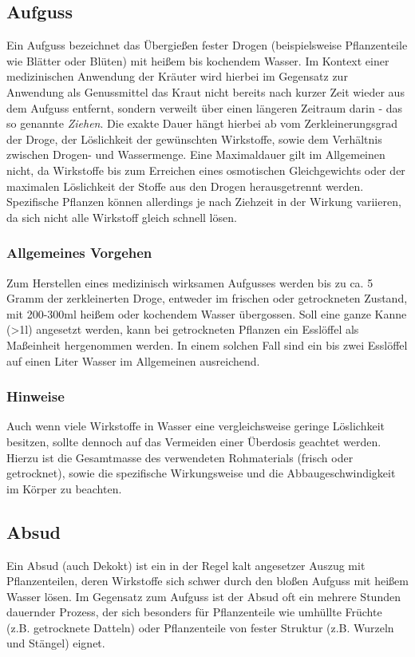 \subsection{Aufguss}
Ein Aufguss bezeichnet das Übergießen fester Drogen (beispielsweise Pflanzenteile wie Blätter oder Blüten) mit heißem bis kochendem Wasser. Im Kontext einer medizinischen Anwendung der Kräuter wird hierbei im Gegensatz zur Anwendung als Genussmittel das Kraut nicht bereits nach kurzer Zeit wieder aus dem Aufguss entfernt, sondern verweilt über einen längeren Zeitraum darin - das so genannte \textit{Ziehen}. Die exakte Dauer hängt hierbei ab vom Zerkleinerungsgrad der Droge, der Löslichkeit der gewünschten Wirkstoffe, sowie dem Verhältnis zwischen Drogen- und Wassermenge. Eine Maximaldauer gilt im Allgemeinen nicht, da Wirkstoffe bis zum Erreichen eines osmotischen Gleichgewichts oder der maximalen Löslichkeit der Stoffe aus den Drogen herausgetrennt werden. Spezifische Pflanzen können allerdings je nach Ziehzeit in der Wirkung variieren, da sich nicht alle Wirkstoff gleich schnell lösen.
\subsubsection{Allgemeines Vorgehen}
Zum Herstellen eines medizinisch wirksamen Aufgusses werden bis zu ca. 5 Gramm der zerkleinerten Droge, entweder im frischen oder getrockneten Zustand, mit 200-300ml heißem oder kochendem Wasser übergossen. Soll eine ganze Kanne (>1l) angesetzt werden, kann bei getrockneten Pflanzen ein Esslöffel als Maßeinheit hergenommen werden. In einem solchen Fall sind ein bis zwei Esslöffel auf einen Liter Wasser im Allgemeinen ausreichend.
\subsubsection{Hinweise}
Auch wenn viele Wirkstoffe in Wasser eine vergleichsweise geringe Löslichkeit besitzen, sollte dennoch auf das Vermeiden einer Überdosis geachtet werden. Hierzu ist die Gesamtmasse des verwendeten Rohmaterials (frisch oder getrocknet), sowie die spezifische Wirkungsweise und die Abbaugeschwindigkeit im Körper zu beachten.

\subsection{Absud}
Ein Absud (auch Dekokt) ist ein in der Regel kalt angesetzer Auszug mit Pflanzenteilen, deren Wirkstoffe sich schwer durch den bloßen Aufguss mit heißem Wasser lösen. Im Gegensatz zum Aufguss ist der Absud oft ein mehrere Stunden dauernder Prozess, der sich besonders für Pflanzenteile wie umhüllte Früchte (z.B. getrocknete Datteln) oder Pflanzenteile von fester Struktur (z.B. Wurzeln und Stängel) eignet.
